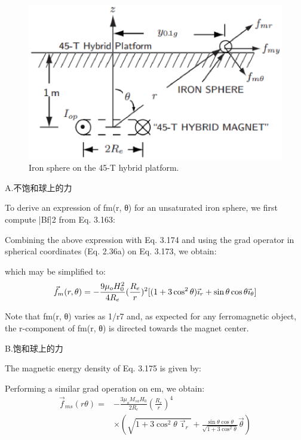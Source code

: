 \begin{figure}[htbp]
	\centering
	\includegraphics[scale=0.5]{chpt3/figs/fig3.46.eps}
	\caption{Iron sphere on the 45-T hybrid platform.}
\end{figure}

A.不饱和球上的力

To derive an expression of fm(r, θ) for an unsaturated iron sphere, we first compute
|Bf|2 from Eq. 3.163:

Combining the above expression with Eq. 3.174 and using the grad operator in
spherical coordinates (Eq. 2.36a) on Eq. 3.173, we obtain:

which may be simplified to:
\begin{equation}
\vec{f}_{m}(r,\theta)=-\frac{9\mu_{o}H_{0}^{2}}{4R_{e}}(\frac{R_{e}}{r})^{2}[(1+3\cos^{2}\theta)\vec{\imath}_{r}+\sin\theta\cos\theta\vec{\imath}_{\theta}]\\%
\end{equation}

Note that fm(r, θ) varies as 1/r7 and, as expected for any ferromagnetic object,
the r-component of fm(r, θ) is directed towards the magnet center.

B.饱和球上的力

The magnetic energy density of Eq. 3.175 is given by:

Performing a similar grad operation on em, we obtain:
\begin{equation}
\begin{split}
\vec{f}_{ms}(r\theta)=&-\frac{3\mu_{o}M_{sa}H_{0}}{2R_{e}}(\frac{R_{e}}{r})^{4}\\
&\times(\sqrt{1+3\cos^{2}\theta\vec{\imath}_{r}}+\frac{\sin\theta\cos\theta}{\sqrt{1+3\cos^{2}\theta}}\vec{\theta})\\%
\end{split}
\end{equation}

